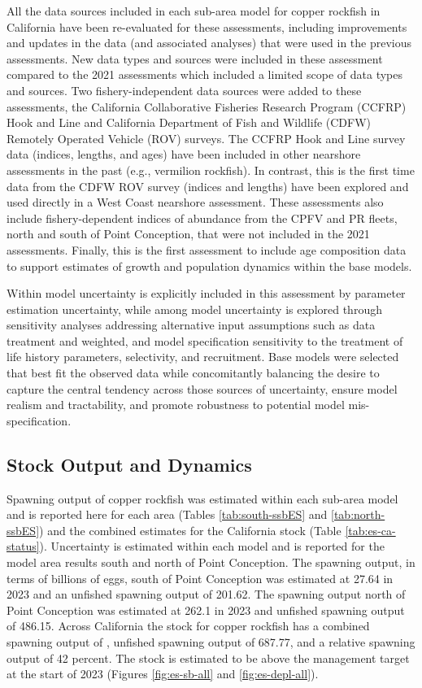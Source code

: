 \documentclass[11pt,
  english,
  letterpaper,
]{article}
\begin{document}
All the data sources included in each sub-area model for copper rockfish in California have been re-evaluated for these assessments, including improvements and updates in the data (and associated analyses) that were used in the previous assessments. New data types and sources were included in these assessment compared to the 2021 assessments which included a limited scope of data types and sources. Two fishery-independent data sources were added to these assessments, the California Collaborative Fisheries Research Program (CCFRP) Hook and Line and California Department of Fish and Wildlife (CDFW) Remotely Operated Vehicle (ROV) surveys. The CCFRP Hook and Line survey data (indices, lengths, and ages) have been included in other nearshore assessments in the past (e.g., vermilion rockfish). In contrast, this is the first time data from the CDFW ROV survey (indices and lengths) have been explored and used directly in a West Coast nearshore assessment. These assessments also include fishery-dependent indices of abundance from the CPFV and PR fleets, north and south of Point Conception, that were not included in the 2021 assessments. Finally, this is the first assessment to include age composition data to support estimates of growth and population dynamics within the base models.

Within model uncertainty is explicitly included in this assessment by parameter estimation uncertainty, while among model uncertainty is explored through sensitivity analyses addressing alternative input assumptions such as data treatment and weighted, and model specification sensitivity to the treatment of life history parameters, selectivity, and recruitment. Base models were selected that best fit the observed data while concomitantly balancing the desire to capture the central tendency across those sources of uncertainty, ensure model realism and tractability, and promote robustness to potential model mis-specification.

\hypertarget{stock-output-and-dynamics}{%
\subsection*{Stock Output and Dynamics}\label{stock-output-and-dynamics}}

Spawning output of copper rockfish was estimated within each sub-area model and is reported here for each area (Tables \ref{tab:south-ssbES} and \ref{tab:north-ssbES}) and the combined estimates for the California stock (Table \ref{tab:es-ca-status}). Uncertainty is estimated within each model and is reported for the model area results south and north of Point Conception. The spawning output, in terms of billions of eggs, south of Point Conception was estimated at 27.64 in 2023 and an unfished spawning output of 201.62. The spawning output north of Point Conception was estimated at 262.1 in 2023 and unfished spawning output of 486.15. Across California the stock for copper rockfish has a combined spawning output of , unfished spawning output of 687.77, and a relative spawning output of 42 percent. The stock is estimated to be above the management target at the start of 2023 (Figures \ref{fig:es-sb-all} and \ref{fig:es-depl-all}).
\end{document}
